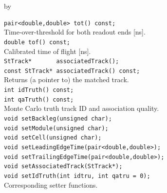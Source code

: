 \documentclass[twoside]{article}
\newcommand{\entrylabel}[1]{\mbox{\textbf{{#1}}}\hfil}%
\newenvironment{entry}
{\begin{list}{}%
    {\renewcommand{\makelabel}{\entrylabel}%
     \setlength{\labelwidth}{90pt}%
     \setlength{\leftmargin}{\labelwidth}
     \advance\leftmargin by \labelsep%
      }%
    }%
  {\end{list}}
\newcommand{\Entrylabel}[1]%
{\raisebox{0pt}[1ex][0pt]{\makebox[\labelwidth][l]%
    {\parbox[t]{\labelwidth}{\hspace{0pt}\textbf{{#1}}}}}}
\newenvironment{Entry}%
{\renewcommand{\entrylabel}{\Entrylabel}\begin{entry}}%
  {\end{entry}}
\begin{document}
\begin{Entry}
    \verb+pair<double,double> tot() const;+\\
    Time-over-threshold for both readout ends [ns].\\
    \verb+double tof() const;+\\
    Calibrated time of flight [ns].\\
    \verb+StTrack*       associatedTrack();+\\
    \verb+const StTrack* associatedTrack() const;+\\
    Returns (a pointer to) the matched track.\\
    \verb+int idTruth() const;+\\
    \verb+int qaTruth() const;+\\
    Monte Carlo truth track ID and association quality.\\
    \verb+void setBackleg(unsigned char);+\\
    \verb+void setModule(unsigned char);+\\
    \verb+void setCell(unsigned char);+\\
    \verb+void setLeadingEdgeTime(pair<double,double>);+\\
    \verb+void setTrailingEdgeTime(pair<double,double>);+\\
    \verb+void setAssociatedTrack(StTrack*);+\\
    \verb+void setIdTruth(int idtru, int qatru = 0);+\\
    Corresponding setter functions.\\
\end{Entry}
\clearpage

\end{document}
